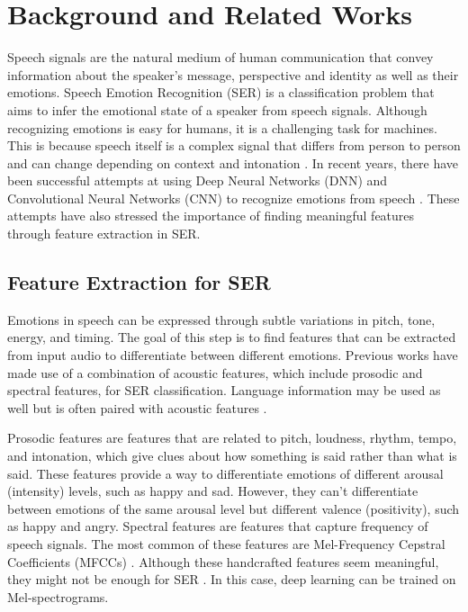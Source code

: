 \documentclass[../main.tex]{subfiles}
\begin{document}
\section{Background and Related Works} 
Speech signals are the natural medium of 
human communication that convey information about the speaker's message, 
perspective and identity as well as their emotions. Speech Emotion Recognition 
(SER) is a classification problem that aims to infer the emotional state of a 
speaker from speech signals. Although recognizing emotions is easy for humans, 
it is a challenging task for machines. This is because speech itself is a 
complex signal that differs from person to person and can change depending on 
context and intonation \citep{Hashem2023} \citep{Koduru2020}. In recent years, there have been successful attempts at 
using Deep Neural Networks (DNN) and Convolutional Neural Networks (CNN) to 
recognize emotions from speech \citep{Pham2023} \cite{Zhang2018}. These attempts have also stressed the importance 
of finding meaningful features through feature extraction in SER.

\subsection{Feature Extraction for SER} 
Emotions in speech can be expressed 
through subtle variations in pitch, tone, energy, and timing. The goal of this 
step is to find features that can be extracted from input audio to differentiate 
between different emotions. Previous works have made use of a combination of 
acoustic features, which include prosodic and spectral features, for SER 
classification. Language information may be used as well but is often paired 
with acoustic features \citep{Pham2023} \cite{Zhang2018}. 

Prosodic features are features that are related to 
pitch, loudness, rhythm, tempo, and intonation, which give clues about how 
something is said rather than what is said. These features provide a way to 
differentiate emotions of different arousal (intensity) levels, such as happy 
and sad. However, they can't differentiate between emotions of the same arousal 
level but different valence (positivity), such as happy and angry. Spectral 
features are features that capture frequency of speech signals. The most common 
of these features are Mel-Frequency Cepstral Coefficients (MFCCs) \citep{Hashem2023}. Although 
these handcrafted features seem meaningful, they might not be enough for SER \citep{Koduru2020}. 
In this case, deep learning can be trained on Mel-spectrograms.
\end{document}
